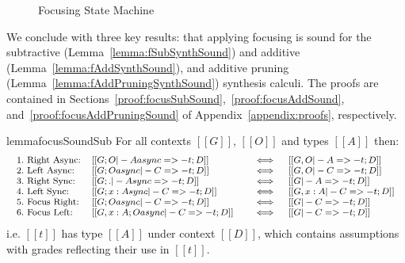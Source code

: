 \begin{figure}[H]
{
}
\caption{Focusing State Machine}
\label{fig:focusingFSM}
\end{figure}

We conclude with three key results: that applying focusing is sound for the
subtractive (Lemma~\ref{lemma:fSubSynthSound}) and additive
(Lemma~\ref{lemma:fAddSynthSound}), and additive pruning
(Lemma~\ref{lemma:fAddPruningSynthSound}) synthesis calculi. The proofs are
contained in Sections~\ref{proof:focusSubSound},~\ref{proof:focusAddSound},
and~\ref{proof:focusAddPruningSound} of Appendix~\ref{appendix:proofs},
respectively.

\begin{restatable}{lemma}{focusSoundSub}
  \label{lemma:fSubSynthSound}
For all contexts $[[ G ]]$, $[[ O ]]$ and types $[[ A ]]$
then:
\begin{align*}
  {\footnotesize{
\begin{array}{lll}
 1.\ \text{Right Async:} & [[ G ; O |- A async =>- t ; D ]] \quad &\iff \quad [[ G , O |- A =>- t ; D ]]\\
 2.\ \text{Left Async:} & [[ G ; O async |- C =>- t ; D ]] \quad &\iff \quad [[ G , O |- C =>- t ; D ]]\\
 3.\ \text{Right Sync:} & [[ G ; . |- A sync =>- t ; D ]] \quad &\iff \quad [[ G |- A =>- t ; D ]]\\
 4.\ \text{Left Sync:} & [[ G ; {x : A }sync |- C =>- t ; D ]] \quad &\iff \quad [[ G, x : A |- C =>- t ; D ]]\\
 5.\ \text{Focus Right:} & [[ G ; O async |- C =>- t ; D ]] \quad &\iff \quad [[ G |- C =>- t ; D ]]\\
 6.\ \text{Focus Left:} & [[ G, x : A ; O async |- C =>- t ; D ]] \quad &\iff \quad [[ G |- C =>- t ; D ]]
\end{array}
  }}
\end{align*}
i.e. $[[ t ]]$ has type $[[ A ]]$
under context $[[ D ]]$,
which contains assumptions with grades reflecting their use in $[[ t ]]$.
\end{restatable}

